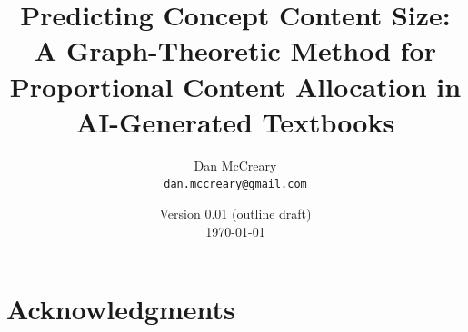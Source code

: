 \documentclass[11pt]{article}
\title{Predicting Concept Content Size: A Graph-Theoretic Method for Proportional Content Allocation in AI-Generated Textbooks}
\author{
    Dan McCreary \\
    \texttt{dan.mccreary@gmail.com}
}
\date{Version 0.01 (outline draft) \\ \today}
\begin{document}
\maketitle












\section*{Acknowledgments}



\end{document}
